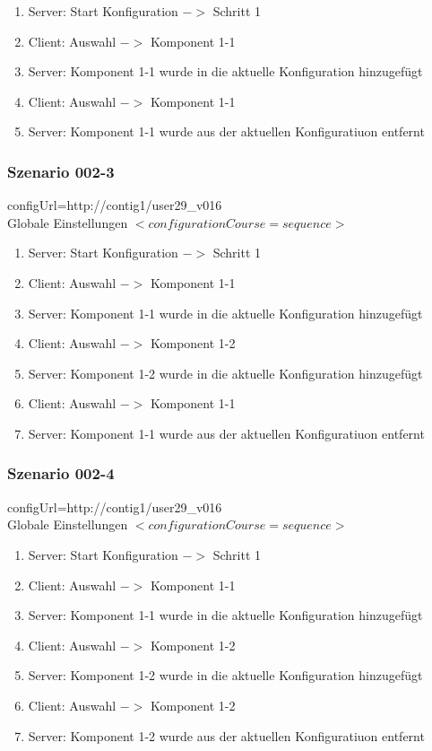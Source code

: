 \documentclass{article}
\begin{document}
\begin{enumerate}
  \item Server: Start Konfiguration $->$ Schritt 1
  \item Client: Auswahl $->$ Komponent 1-1
  \item Server: Komponent 1-1 wurde in die aktuelle Konfiguration hinzugef\"ugt
  \item Client: Auswahl $->$ Komponent 1-1
  \item Server: Komponent 1-1 wurde aus der aktuellen Konfiguratiuon entfernt
\end{enumerate}

\subsubsection{Szenario 002-3}

configUrl=http://contig1/user29\_v016\\

Globale Einstellungen $<configurationCourse=sequence>$

\begin{enumerate}
  \item Server: Start Konfiguration $->$ Schritt 1
  \item Client: Auswahl $->$ Komponent 1-1
  \item Server: Komponent 1-1 wurde in die aktuelle Konfiguration hinzugef\"ugt
  \item Client: Auswahl $->$ Komponent 1-2
  \item Server: Komponent 1-2 wurde in die aktuelle Konfiguration hinzugef\"ugt
  \item Client: Auswahl $->$ Komponent 1-1
  \item Server: Komponent 1-1 wurde aus der aktuellen Konfiguratiuon entfernt
\end{enumerate}

\subsubsection{Szenario 002-4}

configUrl=http://contig1/user29\_v016\\

Globale Einstellungen $<configurationCourse=sequence>$

\begin{enumerate}
  \item Server: Start Konfiguration $->$ Schritt 1
  \item Client: Auswahl $->$ Komponent 1-1
  \item Server: Komponent 1-1 wurde in die aktuelle Konfiguration hinzugef\"ugt
  \item Client: Auswahl $->$ Komponent 1-2
  \item Server: Komponent 1-2 wurde in die aktuelle Konfiguration hinzugef\"ugt
  \item Client: Auswahl $->$ Komponent 1-2
  \item Server: Komponent 1-2 wurde aus der aktuellen Konfiguratiuon entfernt
\end{enumerate}
\end{document}
